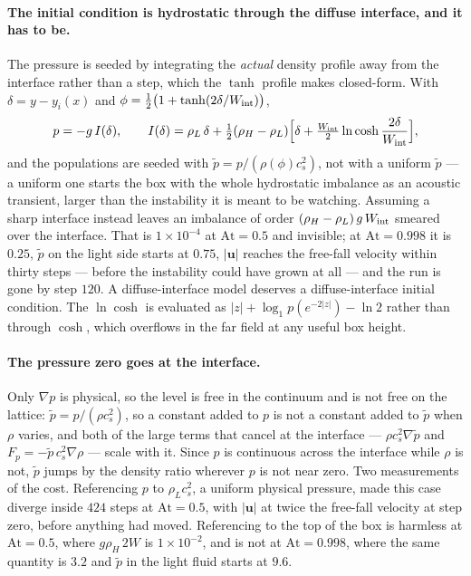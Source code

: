 \documentclass[11pt,a4paper]{article}
\newcommand{\cs}{c_s}
\newcommand{\uu}{\bm{u}}
\newcommand{\e}[1]{\times 10^{#1}}
\begin{document}
\paragraph{The initial condition is hydrostatic through the diffuse interface,
and it has to be.} The pressure is seeded by integrating the \emph{actual}
density profile away from the interface rather than a step, which the $\tanh$
profile makes closed-form. With $\delta = y - y_i(x)$ and
$\phi = \tfrac12\big(1+\tanh(2\delta/W_{\rm int})\big)$,
\begin{equation}
  p = -g\,I(\delta), \qquad
  I(\delta) = \rho_L\,\delta
    + \tfrac12(\rho_H-\rho_L)\Big[\delta
    + \tfrac{W_{\rm int}}{2}\ln\cosh\frac{2\delta}{W_{\rm int}}\Big],
  \label{eq:rthydro}
\end{equation}
and the populations are seeded with $\tilde p = p/(\rho(\phi)\cs^2)$, not with a
uniform $\tilde p$ --- a uniform one starts the box with the whole hydrostatic
imbalance as an acoustic transient, larger than the instability it is meant to
be watching. Assuming a sharp interface instead leaves an imbalance of order
$(\rho_H-\rho_L)\,g\,W_{\rm int}$ smeared over the interface. That is $1\e{-4}$
at $\mathrm{At} = 0.5$ and invisible; at $\mathrm{At} = 0.998$ it is $0.25$,
$\tilde p$ on the light side starts at $0.75$, $|\uu|$ reaches the free-fall
velocity within thirty steps --- before the instability could have grown at all
--- and the run is gone by step $120$. A diffuse-interface model deserves a
diffuse-interface initial condition. The $\ln\cosh$ is evaluated as
$|z| + \log_1\!p(e^{-2|z|}) - \ln 2$ rather than through $\cosh$, which
overflows in the far field at any useful box height.

\paragraph{The pressure zero goes at the interface.} Only $\nabla p$ is
physical, so the level is free in the continuum and is not free on the lattice:
$\tilde p = p/(\rho\cs^2)$, so a constant added to $p$ is not a constant added
to $\tilde p$ when $\rho$ varies, and both of the large terms that cancel at the
interface --- $\rho\cs^2\nabla\tilde p$ and $F_p = -\tilde p\,\cs^2\nabla\rho$
--- scale with it. Since $p$ is continuous across the interface while $\rho$ is
not, $\tilde p$ jumps by the density ratio wherever $p$ is not near zero. Two
measurements of the cost. Referencing $p$ to $\rho_L\cs^2$, a uniform physical
pressure, made this case diverge inside $424$ steps at $\mathrm{At} = 0.5$, with
$|\uu|$ at twice the free-fall velocity at step zero, before anything had moved.
Referencing to the top of the box is harmless at $\mathrm{At} = 0.5$, where
$g\rho_H\,2W$ is $1\e{-2}$, and is not at $\mathrm{At} = 0.998$, where the same
quantity is $3.2$ and $\tilde p$ in the light fluid starts at $9.6$.
\end{document}
